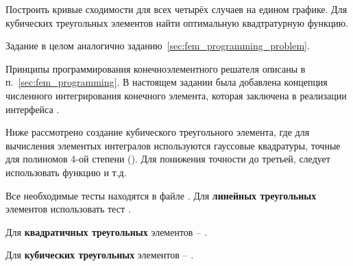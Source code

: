 Построить кривые сходимости для всех четырёх случаев на едином графике.
Для кубических треугольных элементов найти оптимальную квадтратурную функцию.

Задание в целом аналогично заданию~\ref{sec:fem_programming_problem}.

Принципы программирования конечноэлементного решателя описаны в п.~\ref{sec:fem_programming}.
В настоящем задании была добавлена концепция численного интегрирования конечного элемента,
которая заключена в реализации  интерфейса .

Ниже рассмотрено создание кубического треугольного элемента, где для
вычисления элементых интегралов используются гауссовые квадратуры, точные для полиномов 4-ой степени ().
Для понижения точности до третьей, следует использовать функцию
 и т.д.

Все необходимые тесты находятся в файле .
Для {\bf линейных треугольных} элементов использовать тест .

Для {\bf квадратичных треугольных} элементов -- .

Для {\bf кубических треугольных} элементов -- .

